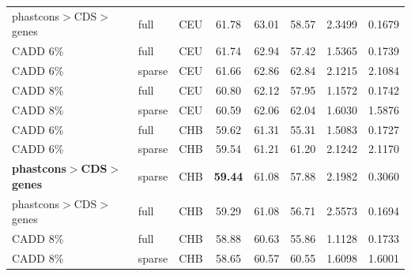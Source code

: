 \documentclass[11pt]{article}
\begin{document}
\begin{table}
\begin{tabular}{lll|crr|cc}
phastcons$>$CDS$>$genes &              full &          CEU &                        61.78 &             63.01 &            58.57 &                                 2.3499 &                                0.1679 \\
               CADD 6\% &              full &          CEU &                        61.74 &             62.94 &            57.42 &                                 1.5365 &                                0.1739 \\
               CADD 6\% &            sparse &          CEU &                        61.66 &             62.86 &            62.84 &                                 2.1215 &                                2.1084 \\
               CADD 8\% &              full &          CEU &                        60.80 &             62.12 &            57.95 &                                 1.1572 &                                0.1742 \\
               CADD 8\% &            sparse &          CEU &                        60.59 &             62.06 &            62.04 &                                 1.6030 &                                1.5876 \\
               CADD 6\% &              full &          CHB &                        59.62 &             61.31 &            55.31 &                                 1.5083 &                                0.1727 \\
               CADD 6\% &            sparse &          CHB &                        59.54 &             61.21 &            61.20 &                                 2.1242 &                                2.1170 \\
               \textbf{phastcons$>$CDS$>$genes} &            sparse &          CHB &                        \textbf{59.44} &             61.08 &            57.88 &                                 2.1982 &                                0.3060 \\
phastcons$>$CDS$>$genes &              full &          CHB &                        59.29 &             61.08 &            56.71 &                                 2.5573 &                                0.1694 \\
               CADD 8\% &              full &          CHB &                        58.88 &             60.63 &            55.86 &                                 1.1128 &                                0.1733 \\
               CADD 8\% &            sparse &          CHB &                        58.65 &             60.57 &            60.55 &                                 1.6098 &                                1.6001 \\

\end{tabular}
\end{table}
\end{document}
